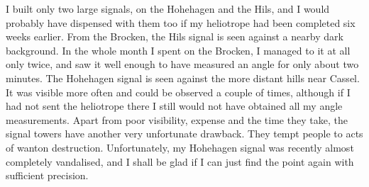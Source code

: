 \par\noindent\hspace*{\parindent}I built only two large signals, on the Hohehagen and the Hils, and I would probably have dispensed with them too if my heliotrope had been completed six weeks earlier.
From the Brocken, the Hils signal is seen against a nearby dark background. In the whole month I spent on the Brocken, I managed to  it at all only twice, and saw it well enough to have measured an angle for only about two minutes. The Hohehagen signal is seen against the more distant hills near Cassel. It was visible more often and could be observed a couple of times, although if I had not sent the heliotrope there I still would not have obtained all my angle measurements.
Apart from poor visibility, expense and the time they take, the signal towers have another very unfortunate drawback. They tempt people to acts of wanton destruction.
Unfortunately, my Hohehagen signal was recently almost completely vandalised, and I shall be glad if I can just find the point again with sufficient precision.

